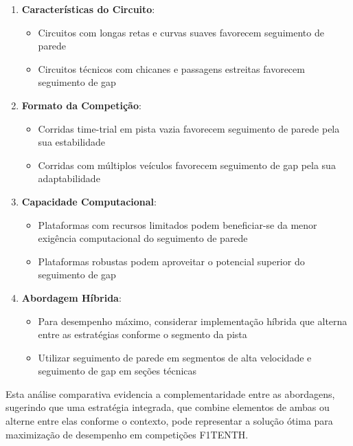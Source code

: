 \begin{enumerate}
    \item \textbf{Características do Circuito}:
          \begin{itemize}
              \item Circuitos com longas retas e curvas suaves favorecem seguimento de parede
              \item Circuitos técnicos com chicanes e passagens estreitas favorecem seguimento de
                    gap
          \end{itemize}

    \item \textbf{Formato da Competição}:
          \begin{itemize}
              \item Corridas time-trial em pista vazia favorecem seguimento de parede pela sua
                    estabilidade
              \item Corridas com múltiplos veículos favorecem seguimento de gap pela sua
                    adaptabilidade
          \end{itemize}

    \item \textbf{Capacidade Computacional}:
          \begin{itemize}
              \item Plataformas com recursos limitados podem beneficiar-se da menor exigência
                    computacional do seguimento de parede
              \item Plataformas robustas podem aproveitar o potencial superior do seguimento de gap
          \end{itemize}

    \item \textbf{Abordagem Híbrida}:
          \begin{itemize}
              \item Para desempenho máximo, considerar implementação híbrida que alterna entre as
                    estratégias conforme o segmento da pista
              \item Utilizar seguimento de parede em segmentos de alta velocidade e seguimento de
                    gap em seções técnicas
          \end{itemize}
\end{enumerate}

Esta análise comparativa evidencia a complementaridade entre as abordagens,
sugerindo que uma estratégia integrada, que combine elementos de ambas ou
alterne entre elas conforme o contexto, pode representar a solução ótima para
maximização de desempenho em competições F1TENTH.

